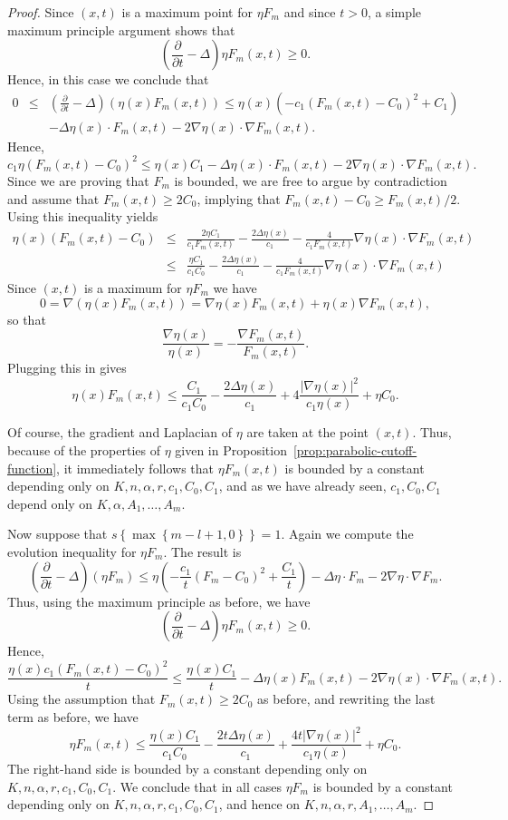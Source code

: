 \begin{proof}
 Since $(x,t)$ is a maximum point for $\eta F_m$ and since
$t>0$,  a simple maximum principle argument shows that
$$\left(  \frac{\partial}{\partial t}-\Delta\right)\eta  F_{m}(x,t)\ge 0.$$
Hence, in this case we conclude that
\begin{eqnarray*} 0& \le & \left(
\frac{\partial}{\partial t}-\Delta\right)  \left( \eta(x)
F_{m}(x,t)\right) \leq\eta(x)\left(  -c_1\left(
F_{m}(x,t)-C_0\right)^{2}+C_1\right) \\
& &  -\Delta\eta(x)\cdot F_m(x,t)-2\nabla\eta(x)\cdot\nabla
F_m(x,t). \end{eqnarray*}
 Hence, $$c_1\eta (F_m(x,t)-C_0)^2\le \eta(x)
C_1-\Delta\eta(x)\cdot F_m(x,t)-2\nabla\eta(x)\cdot \nabla F_m(x,t).$$ Since we
are proving that $F_m$ is bounded, we are free to argue by contradiction and
assume that $F_m(x,t)\ge 2C_0$, implying that $F_m(x,t)-C_0\ge F_m(x,t)/2$.
Using this inequality yields \begin{eqnarray*} \eta(x) (F_m(x,t)-C_0) & \le &
\frac{2\eta C_1}{c_1F_m(x,t)}-\frac{2\Delta\eta(x)}{c_1} -\frac{4}{c_1F_m(x,t)}
\nabla\eta(x)\cdot\nabla F_m(x,t) \\
&\le &  \frac{\eta C_1}{c_1C_0}-\frac{2\Delta\eta(x)}{c_1}
-\frac{4}{c_1F_m(x,t)} \nabla\eta(x)\cdot\nabla F_m(x,t)\end{eqnarray*}
Since
$(x,t)$ is a maximum for $\eta F_m$ we have
$$0=\nabla(\eta(x) F_m(x,t))=\nabla\eta(x) F_m(x,t)+\eta(x)\nabla F_m(x,t),$$
so that
$$\frac{\nabla\eta(x)}{\eta(x)}=-\frac{\nabla F_m(x,t)}{F_m(x,t)}.$$
Plugging this in gives
$$\eta(x) F_m(x,t)\le
\frac{C_1}{c_1C_0}-\frac{2\Delta\eta(x)}{c_1}+4\frac{|\nabla\eta(x)|^2}{c_1\eta(x)}+\eta
C_0.$$

Of course, the gradient and Laplacian of $\eta$ are taken at the
point $(x,t)$.  Thus, because of the properties of $\eta$ given in
Proposition~\ref{prop:parabolic-cutoff-function}, it immediately follows that $\eta F_m(x,t)$ is
bounded by a constant depending
 only on $K,n,\alpha,r,c_1,C_0,C_1$, and as we have already seen, $c_1,C_0,C_1$ depend only on
 $K,\alpha,A_1,\ldots,A_m$.

Now suppose that $s\left\{  \max\left\{  m-l+1,0\right\}
\right\}=1.$ Again we compute the evolution inequality for $\eta
F_{m}$. The result is $$\left(  \frac{\partial}{\partial
t}-\Delta\right) \left(  \eta F_{m}\right) \leq\eta\left(
-\frac{c_1}{t} (F_{m}-C_0)^{2}+\frac{C_1}{t}\right) -\Delta\eta\cdot
F_m-2\nabla\eta\cdot\nabla F_m.$$ Thus,  using the maximum principle
as before, we have
$$\left(  \frac{\partial}{\partial t}-\Delta\right)\eta  F_{m}(x,t)\ge 0.$$
Hence,
$$\frac{\eta(x) c_1(F_m(x,t)-C_0)^2}{t}\le
\frac{\eta(x)C_1}{t}-\Delta\eta(x)F_m(x,t)-2\nabla\eta(x)\cdot\nabla F_m(x,t).$$
Using the assumption that $F_m(x,t)\ge 2C_0$ as before, and rewriting the last
term as before, we have
$$\eta F_m(x,t)\le
\frac{\eta(x)C_1}{c_1C_0}-\frac{2t\Delta\eta(x)}
{c_1}+\frac{4t|\nabla\eta(x)|^2}{c_1\eta(x)}+\eta C_0.$$ The right-hand side is
bounded by a constant depending only on $K,n,\alpha,r,c_1,C_0,C_1$. We conclude
that in all cases $\eta F_{m}$ is bounded by a constant depending only on
$K,n,\alpha,r,c_1,C_0,C_1$, and hence on $K,n,\alpha,r,A_1,\ldots,A_m$.



\end{proof}
